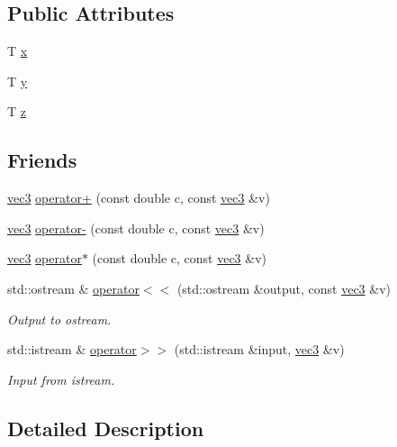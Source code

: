 \subsection*{Public Attributes}
\begin{DoxyCompactItemize}
\item 
T \mbox{\hyperlink{structvec3_a3f1f0c60e13b8bf67f64b1afc9cd6d1a}{x}}
\item 
T \mbox{\hyperlink{structvec3_a77c2f238c0b2b7895304f5ca64b8d770}{y}}
\item 
T \mbox{\hyperlink{structvec3_a7879033e3409225479ae0079c92d9afd}{z}}
\end{DoxyCompactItemize}
\subsection*{Friends}
\begin{DoxyCompactItemize}
\item 
\mbox{\hyperlink{structvec3}{vec3}} \mbox{\hyperlink{structvec3_a5a4f97c459eb49bb2e18ed9f0e486114}{operator+}} (const double c, const \mbox{\hyperlink{structvec3}{vec3}} \&v)
\item 
\mbox{\hyperlink{structvec3}{vec3}} \mbox{\hyperlink{structvec3_a3daa3a334acdaef0cebfb9cb8b7c2992}{operator-\/}} (const double c, const \mbox{\hyperlink{structvec3}{vec3}} \&v)
\item 
\mbox{\hyperlink{structvec3}{vec3}} \mbox{\hyperlink{structvec3_a8e5a34109d722a0e43d027e496eebc98}{operator$\ast$}} (const double c, const \mbox{\hyperlink{structvec3}{vec3}} \&v)
\item 
std\+::ostream \& \mbox{\hyperlink{structvec3_af5e1bcad9d3d484d6f4e6b3f8949f5cf}{operator$<$$<$}} (std\+::ostream \&output, const \mbox{\hyperlink{structvec3}{vec3}} \&v)
\begin{DoxyCompactList}\small\item\em Output to ostream. \end{DoxyCompactList}\item 
std\+::istream \& \mbox{\hyperlink{structvec3_a72f92578884bd68e0747871acd8545fd}{operator$>$$>$}} (std\+::istream \&input, \mbox{\hyperlink{structvec3}{vec3}} \&v)
\begin{DoxyCompactList}\small\item\em Input from istream. \end{DoxyCompactList}\end{DoxyCompactItemize}


\subsection{Detailed Description}
